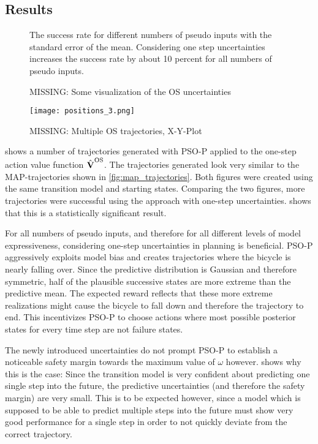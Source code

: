 \subsection{Results}
\begin{figure}[tp]
    \centering
    \caption[Results using one step uncertainties]{
        The success rate for different numbers of pseudo inputs with the standard error of the mean.
        Considering one step uncertainties increases the success rate by about 10 percent for all numbers of pseudo inputs.
    }
    \label{fig:os_results}
\end{figure}
\begin{figure}[tp]
    \centering
    \caption{MISSING: Some visualization of the OS uncertainties}
    \label{fig:os_uncertainties}
\end{figure}
\begin{figure}[p]
    \centering
    \texttt{[image: positions\_3.png]}
    \caption{MISSING: Multiple OS trajectories, X-Y-Plot}
    \label{fig:os_trajectories}
\end{figure}
 shows a number of trajectories generated with PSO-P applied to the one-step action value function $\operatorname{\hat{\operatorname{\mathbf{V}}}}^{\text{OS}}$.
The trajectories generated look very similar to the MAP-trajectories shown in \cref{fig:map_trajectories}.
Both figures were created using the same transition model and starting states.
Comparing the two figures, more trajectories were successful using the approach with one-step uncertainties.
 shows that this is a statistically significant result.

For all numbers of pseudo inputs, and therefore for all different levels of model expressiveness, considering one-step uncertainties in planning is beneficial.
PSO-P aggressively exploits model bias and creates trajectories where the bicycle is nearly falling over.
Since the predictive distribution is Gaussian and therefore symmetric, half of the plausible successive states are more extreme than the predictive mean.
The expected reward reflects that these more extreme realizations might cause the bicycle to fall down and therefore the trajectory to end.
This incentivizes PSO-P to choose actions where most possible posterior states for every time step are not failure states.

The newly introduced uncertainties do not prompt PSO-P to establish a noticeable safety margin towards the maximum value of $\omega$ however.
 shows why this is the case:
Since the transition model is very confident about predicting one single step into the future, the predictive uncertainties (and therefore the safety margin) are very small.
This is to be expected however, since a model which is supposed to be able to predict multiple steps into the future must show very good performance for a single step in order to not quickly deviate from the correct trajectory.

